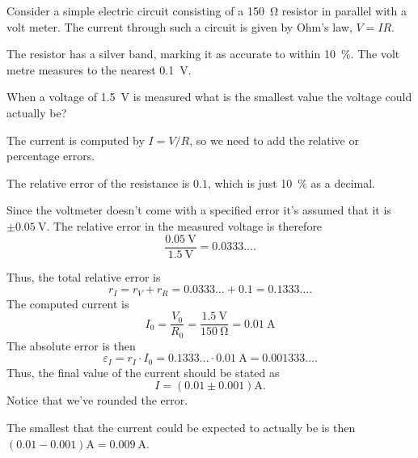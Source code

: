 \documentclass[fleqn]{LectureClass/LectureClass}
\begin{document}
    \begin{exm}{}{}
        Consider a simple electric circuit consisting of a \qty{150}{\ohm} resistor in parallel with a volt meter.
        The current through such a circuit is given by Ohm's law, \(V = IR\).
        
        The resistor has a silver band, marking it as accurate to within \qty{10}{\percent}.
        The volt metre measures to the nearest \qty{0.1}{\volt}.
        
        When a voltage of \qty{1.5}{\volt} is measured what is the smallest value the voltage could actually be?
        
        The current is computed by \(I = V/R\), so we need to add the relative or percentage errors.
        
        The relative error of the resistance is \(0.1\), which is just \qty{10}{\percent} as a decimal.
        
        Since the voltmeter doesn't come with a specified error it's assumed that it is \(\pm \qty{0.05}{\volt}\).
        The relative error in the measured voltage is therefore
        \begin{equation}
            \frac{\qty{0.05}{\volt}}{\qty{1.5}{\volt}} = 0.0333\dots.
        \end{equation}
        
        Thus, the total relative error is
        \begin{equation}
            r_I = r_V + r_R = 0.0333\dots + 0.1 = 0.1333\dots.
        \end{equation}
        The computed current is
        \begin{equation}
            I_0 = \frac{V_0}{R_0} = \frac{\qty{1.5}{\volt}}{\qty{150}{\ohm}} = \qty{0.01}{\ampere}
        \end{equation}
        The absolute error is then
        \begin{equation}
            \varepsilon_I = r_I \cdot I_0 = 0.1333\dots \cdot \qty{0.01}{\ampere} = 0.001333\dots.
        \end{equation}
        Thus, the final value of the current should be stated as
        \begin{equation}
            I = (0.01 \pm 0.001) \unit{\ampere}.
        \end{equation}
        Notice that we've rounded the error.
        
        The smallest that the current could be expected to actually be is then \((0.01 - 0.001) \unit{\ampere} = \qty{0.009}{\ampere}\).
    \end{exm}
    
\end{document}
